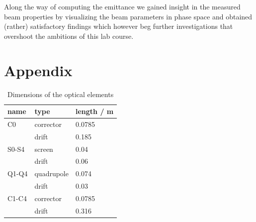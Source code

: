 \documentclass[11pt,a4paper,notitlepage]{scrartcl}
\begin{document}
Along the way of computing the emittance we gained insight in the measured beam properties by visualizing the beam parameters in phase space and obtained (rather) satisfactory findings which however beg further investigations that overshoot the ambitions of this lab course.
\newpage
\appendix\section{Appendix}\label{sec:Appendix}
\begin{table}[htbp]
	\centering
	\begin{tabular}{|l|l|l|}
		\hline
		name  & type       & length / m \\
		\hline
		C0    & corrector  & 0.0785     \\
		& drift      & 0.185      \\
		S0-S4 & screen     & 0.04       \\
		& drift      & 0.06       \\
		Q1-Q4 & quadrupole & 0.074      \\
		& drift      & 0.03       \\
		C1-C4 & corrector  & 0.0785     \\
		& drift      & 0.316     \\
		\hline
	\end{tabular}
\caption{Dimensions of the optical elements \cite{script}}\label{tab:LAB_dimensions}
\end{table}
\end{document}
